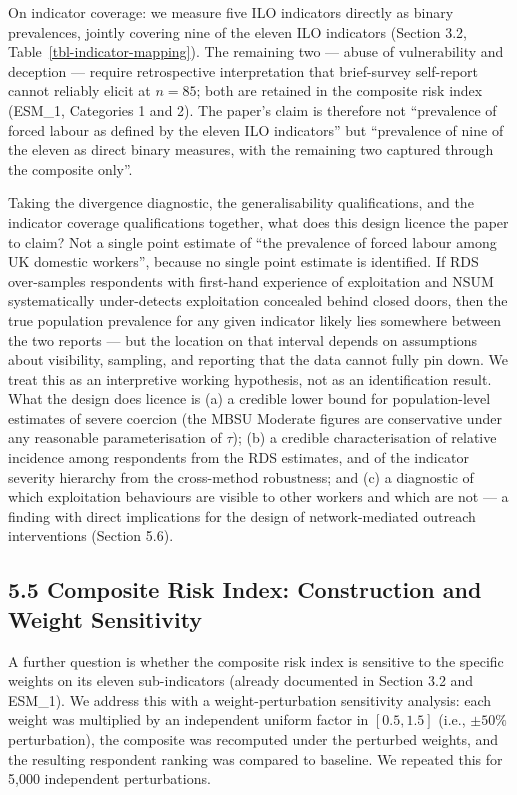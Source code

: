 \documentclass[
  12pt,
  letterpaper,
  DIV=11,
  numbers=noendperiod]{scrartcl}
\begin{document}
On indicator coverage: we measure five ILO indicators directly as binary
prevalences, jointly covering nine of the eleven ILO indicators (Section
3.2, Table~\ref{tbl-indicator-mapping}). The remaining two --- abuse of
vulnerability and deception --- require retrospective interpretation
that brief-survey self-report cannot reliably elicit at \(n = 85\); both
are retained in the composite risk index (ESM\_1, Categories 1 and 2).
The paper's claim is therefore not ``prevalence of forced labour as
defined by the eleven ILO indicators'' but ``prevalence of nine of the
eleven as direct binary measures, with the remaining two captured
through the composite only''.

Taking the divergence diagnostic, the generalisability qualifications,
and the indicator coverage qualifications together, what does this
design licence the paper to claim? Not a single point estimate of ``the
prevalence of forced labour among UK domestic workers'', because no
single point estimate is identified. If RDS over-samples respondents
with first-hand experience of exploitation and NSUM systematically
under-detects exploitation concealed behind closed doors, then the true
population prevalence for any given indicator likely lies somewhere
between the two reports --- but the location on that interval depends on
assumptions about visibility, sampling, and reporting that the data
cannot fully pin down. We treat this as an interpretive working
hypothesis, not as an identification result. What the design does
licence is (a) a credible lower bound for population-level estimates of
severe coercion (the MBSU Moderate figures are conservative under any
reasonable parameterisation of \(\tau\)); (b) a credible
characterisation of relative incidence among respondents from the RDS
estimates, and of the indicator severity hierarchy from the cross-method
robustness; and (c) a diagnostic of which exploitation behaviours are
visible to other workers and which are not --- a finding with direct
implications for the design of network-mediated outreach interventions
(Section 5.6).

\subsection{5.5 Composite Risk Index: Construction and Weight
Sensitivity}\label{composite-risk-index-construction-and-weight-sensitivity}

A further question is whether the composite risk index is sensitive to
the specific weights on its eleven sub-indicators (already documented in
Section 3.2 and ESM\_1). We address this with a weight-perturbation
sensitivity analysis: each weight was multiplied by an independent
uniform factor in \([0.5, 1.5]\) (i.e., \(\pm 50\%\) perturbation), the
composite was recomputed under the perturbed weights, and the resulting
respondent ranking was compared to baseline. We repeated this for 5,000
independent perturbations.
\end{document}
